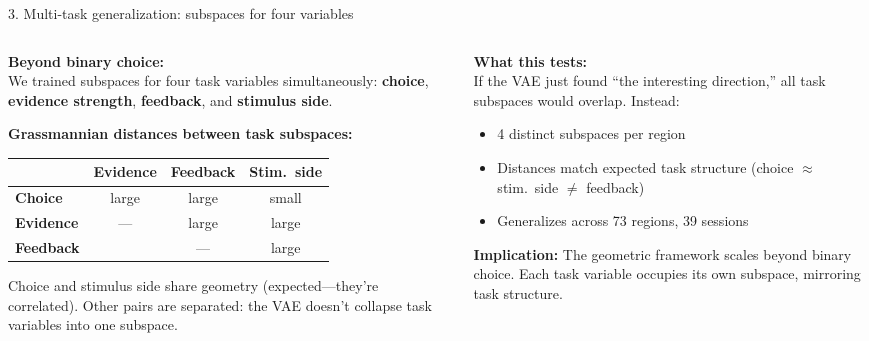 \documentclass[aspectratio=169,11pt]{beamer}
\begin{document}
\begin{frame}{3. Multi-task generalization: subspaces for four variables}
\begin{columns}[T]
\begin{column}{0.48\textwidth}
\textbf{Beyond binary choice:}\\[0.3em]
{\small We trained subspaces for four task variables simultaneously: \textbf{choice}, \textbf{evidence strength}, \textbf{feedback}, and \textbf{stimulus side}.}

\vspace{0.5em}
\textbf{Grassmannian distances between task subspaces:}\\[0.3em]
{\scriptsize
\begin{tabular}{lccc}
\toprule
 & \textbf{Evidence} & \textbf{Feedback} & \textbf{Stim.\ side} \\
\midrule
\textbf{Choice} & large & large & \textcolor{fail}{small} \\
\textbf{Evidence} & --- & large & large \\
\textbf{Feedback} & & --- & large \\
\bottomrule
\end{tabular}
}

\vspace{0.5em}
{\small Choice and stimulus side share geometry (expected---they're correlated). Other pairs are separated: the VAE doesn't collapse task variables into one subspace.}
\end{column}
\begin{column}{0.50\textwidth}
\textbf{What this tests:}\\[0.2em]
{\small If the VAE just found ``the interesting direction,'' all task subspaces would overlap. Instead:}
\vspace{0.2em}
{\small
\begin{itemize}\setlength\itemsep{1pt}
  \item 4 distinct subspaces per region
  \item Distances match expected task structure (choice $\approx$ stim.\ side $\neq$ feedback)
  \item Generalizes across 73 regions, 39 sessions
\end{itemize}
}

\vspace{0.3em}
{\small \textbf{Implication:} The geometric framework scales beyond binary choice. Each task variable occupies its own subspace, mirroring task structure.}
\end{column}
\end{columns}
\end{frame}
\end{document}
